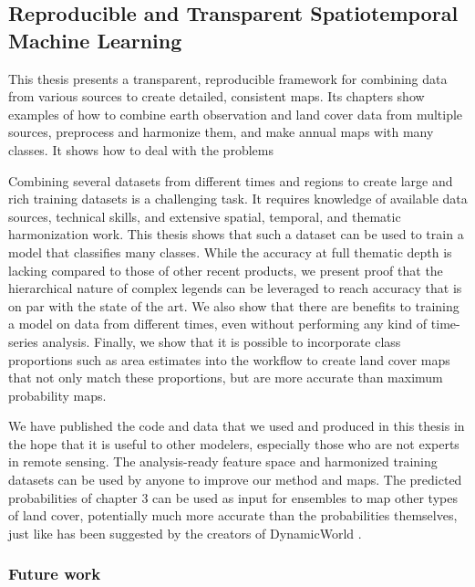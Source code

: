     \subsection{Reproducible and Transparent Spatiotemporal Machine Learning}

        This thesis presents a transparent, reproducible framework for combining data from various sources to create detailed, consistent maps. Its chapters show examples of how to combine earth observation and land cover data from multiple sources, preprocess and harmonize them, and make annual maps with many classes. It shows how to deal with the problems
        
        Combining several datasets from different times and regions to create large and rich training datasets is a challenging task. It requires knowledge of available data sources, technical skills, and extensive spatial, temporal, and thematic harmonization work. This thesis shows that such a dataset can be used to train a model that classifies many classes. While the accuracy at full thematic depth is lacking compared to those of other recent products, we present proof that the hierarchical nature of complex legends can be leveraged to reach accuracy that is on par with the state of the art. We also show that there are  benefits to training a model on data from different times, even without performing any kind of time-series analysis. Finally, we show that it is possible to incorporate class proportions such as area estimates into the workflow to create land cover maps that not only match these proportions, but are more accurate than maximum probability maps.

        We have published the code and data that we used and produced in this thesis in the hope that it is useful to other modelers, especially those who are not experts in remote sensing. The analysis-ready feature space and harmonized training datasets can be used by anyone to improve our method and maps. The predicted probabilities of chapter 3 can be used as input for ensembles to map other types of land cover, potentially much more accurate than the probabilities themselves, just like has been suggested by the creators of DynamicWorld \citep{brown2022dynamic}.

        \subsubsection{Future work}


